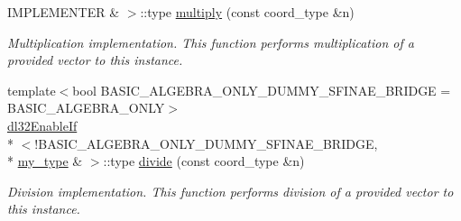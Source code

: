 \begin{DoxyCompactItemize}
I\-M\-P\-L\-E\-M\-E\-N\-T\-E\-R \& $>$\-::type \hyperlink{struct__vector__2d__implementation__homebrew_aeb57949f6d07928b11b88e7e2a55d4f2}{multiply} (const coord\-\_\-type \&n)
\begin{DoxyCompactList}\small\item\em Multiplication implementation. This function performs multiplication of a provided vector to this instance. \end{DoxyCompactList}\item 
{\footnotesize template$<$bool B\-A\-S\-I\-C\-\_\-\-A\-L\-G\-E\-B\-R\-A\-\_\-\-O\-N\-L\-Y\-\_\-\-D\-U\-M\-M\-Y\-\_\-\-S\-F\-I\-N\-A\-E\-\_\-\-B\-R\-I\-D\-G\-E = B\-A\-S\-I\-C\-\_\-\-A\-L\-G\-E\-B\-R\-A\-\_\-\-O\-N\-L\-Y$>$ }\\\hyperlink{structdl32_enable_if}{dl32\-Enable\-If}\\*
$<$!B\-A\-S\-I\-C\-\_\-\-A\-L\-G\-E\-B\-R\-A\-\_\-\-O\-N\-L\-Y\-\_\-\-D\-U\-M\-M\-Y\-\_\-\-S\-F\-I\-N\-A\-E\-\_\-\-B\-R\-I\-D\-G\-E, \\*
\hyperlink{struct__vector__2d__implementation__homebrew}{my\-\_\-type} \& $>$\-::type \hyperlink{struct__vector__2d__implementation__homebrew_a803a8ee8c5cf68aefc2a260bc381e240}{divide} (const coord\-\_\-type \&n)
\begin{DoxyCompactList}\small\item\em Division implementation. This function performs division of a provided vector to this instance. \end{DoxyCompactList}\end{DoxyCompactItemize}
